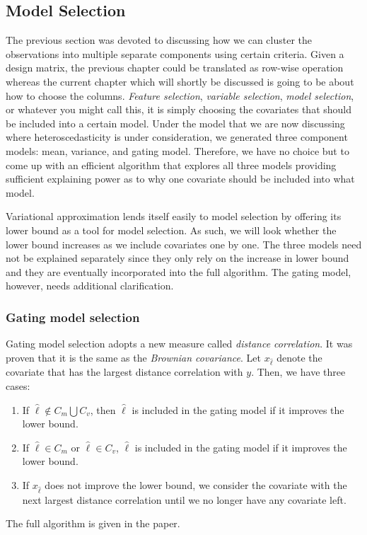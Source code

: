 \documentclass[11pt]{article}
\begin{document}
\subsection{Model Selection}
The previous section was devoted to discussing how we can cluster the observations into multiple separate components using certain criteria. Given a design matrix, the previous chapter could be translated as row-wise operation whereas the current chapter which will shortly be discussed is going to be about how to choose the columns. \emph{Feature selection}, \emph{variable selection}, \emph{model selection}, or whatever you might call this, it is simply choosing the covariates that should be included into a certain model. Under the model that we are now discussing where heteroscedasticity is under consideration, we generated three component models: mean, variance, and gating model. Therefore, we have no choice but to come up with an efficient algorithm that explores all three models providing sufficient explaining power as to why one covariate should be included into what model.\par
Variational approximation lends itself easily to model selection by offering its lower bound as a tool for model selection. As such, we will look whether the lower bound increases as we include covariates one by one. The three models need not be explained separately since they only rely on the increase in lower bound and they are eventually incorporated into the full algorithm. The gating model, however, needs additional clarification.
\subsubsection{Gating model selection}
Gating model selection adopts a new measure called \emph{distance correlation}. It was proven that it is the same as the \emph{Brownian covariance}. Let $x_{\hat{\ell}}$ denote the covariate that has the largest distance correlation with $y$. Then, we have three cases:
\begin{enumerate}
  \item If $\hat{\ell} \notin C_{m}\bigcup C_{v}$, then $\hat{\ell}$ is included in the gating model if it improves the lower bound.
  \item If $\hat{\ell} \in C_{m}$ or $\hat{\ell} \in C_{v}$, $\hat{\ell}$ is included in the gating model if it improves the lower bound.
  \item If $x_{\hat{\ell}}$ does not improve the lower bound, we consider the covariate with the next largest distance correlation until we no longer have any covariate left.
\end{enumerate}
The full algorithm is given in the paper.
\end{document}
